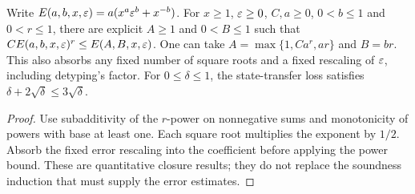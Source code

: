 \begin{lemma}
\label{lem:intro-error-absorption}
\leanok
Write $E(a,b,x,\varepsilon)=a(x^a\varepsilon^b+x^{-b})$. For $x\geq1$, $\varepsilon\geq0$,
$C,a\geq0$, $0<b\leq1$ and $0<r\leq1$, there are explicit $A\geq1$ and
$0<B\leq1$ such that $C E(a,b,x,\varepsilon)^r\leq E(A,B,x,\varepsilon)$.
One can take $A=\max\{1,Ca^r,ar\}$ and $B=br$. This also absorbs any fixed
number of square roots and a fixed rescaling of $\varepsilon$, including detyping's
factor. For $0\leq\delta\leq1$, the state-transfer loss satisfies
$\delta+2\sqrt\delta\leq3\sqrt\delta$.
\end{lemma}
\begin{proof}
\leanok
Use subadditivity of the $r$-power on nonnegative sums and monotonicity of powers
with base at least one. Each square root multiplies the exponent by $1/2$.
Absorb the fixed error rescaling into the coefficient before applying the
power bound. These are quantitative closure results; they do not replace the
soundness induction that must supply the error estimates.
\end{proof}

